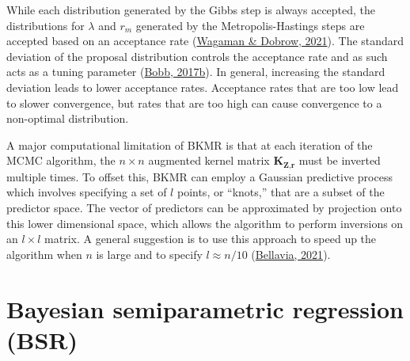 \documentclass[12pt, twoside]{amherstthesis}
\begin{document}
While each distribution generated by the Gibbs step is always accepted, the distributions for \(\lambda\) and \(r_m\) generated by the Metropolis-Hastings steps are accepted based on an acceptance rate (\protect\hyperlink{ref-wagaman_probability_2021}{Wagaman \& Dobrow, 2021}). The standard deviation of the proposal distribution controls the acceptance rate and as such acts as a tuning parameter (\protect\hyperlink{ref-bobb_example_2017}{Bobb, 2017b}). In general, increasing the standard deviation leads to lower acceptance rates. Acceptance rates that are too low lead to slower convergence, but rates that are too high can cause convergence to a non-optimal distribution.

A major computational limitation of BKMR is that at each iteration of the MCMC algorithm, the \(n \times n\) augmented kernel matrix \(\textbf{K}_{\textbf{Z},\textbf{r}}\) must be inverted multiple times. To offset this, BKMR can employ a Gaussian predictive process which involves specifying a set of \(l\) points, or ``knots,'' that are a subset of the predictor space. The vector of predictors can be approximated by projection onto this lower dimensional space, which allows the algorithm to perform inversions on an \(l\times l\) matrix. A general suggestion is to use this approach to speed up the algorithm when \(n\) is large and to specify \(l\approx n/10\) (\protect\hyperlink{ref-bellavia_statistical_2021}{Bellavia, 2021}).

\hypertarget{bsr}{%
\section{Bayesian semiparametric regression (BSR)}\label{bsr}}
\end{document}
